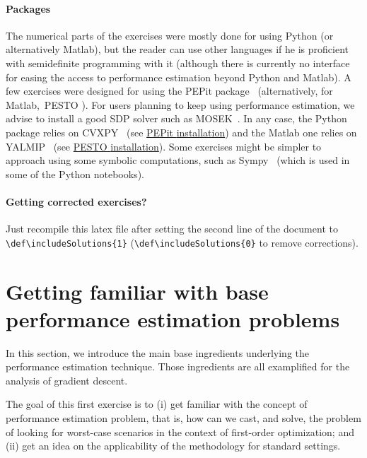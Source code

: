 \documentclass[11pt,a4paper]{article}
\def\includeSolutions{0} %
\newcommand{\pesto}{{PESTO }}
\newcommand{\pepit}{{PEPit }}
\begin{document}
\paragraph{Packages} The numerical parts of the exercises were mostly done for using Python (or alternatively Matlab), but the reader can use other languages if he is proficient with semidefinite programming with it (although there is currently no interface for easing the access to performance estimation beyond Python and Matlab). A few exercises were designed for using the \pepit package~\cite{goujaud2022pepit} (alternatively, for Matlab,~\pesto\cite{pesto2017}). For users planning to keep using performance estimation, we advise to install a good SDP solver such as MOSEK~\cite{mosek2010}. In any case, the Python package relies on CVXPY~\cite{diamond2016cvxpy} (see \href{https://github.com/PerformanceEstimation/PEPit}{\pepit installation}) and the Matlab one relies on YALMIP~\cite{Yalmip2004} (see \href{https://github.com/PerformanceEstimation/Performance-Estimation-Toolbox/wiki/Toolbox-(and-dependencies)-installation}{\pesto installation}). Some exercises might be simpler to approach using some symbolic computations, such as Sympy~\cite{meurer2017sympy} (which is used in some of the Python notebooks). 

{\color{blue}\paragraph{Getting corrected exercises?} Just recompile this latex file after setting the second line of the document to \verb?\def\includeSolutions{1}? (\verb?\def\includeSolutions{0}? to remove corrections).}

	\section{Getting familiar with base performance estimation problems}	\label{s:pep_basis}	%
	In this section, we introduce the main base ingredients underlying the performance estimation technique. Those ingredients are all examplified for the analysis of gradient descent.
	
	The goal of this first exercise is to (i) get familiar with the concept of performance estimation problem, that is, how can we cast, and solve, the problem of looking for worst-case scenarios in the context of first-order optimization; and (ii) get an idea on the applicability of the methodology for standard settings.
	
\end{document}
